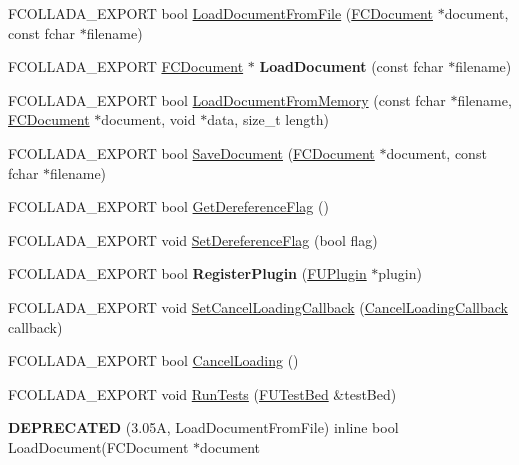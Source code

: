 \begin{DoxyCompactItemize}
\item 
FCOLLADA\_\-EXPORT bool \hyperlink{namespaceFCollada_a4dd920a75d275f9390696c22b947baf8}{LoadDocumentFromFile} (\hyperlink{classFCDocument}{FCDocument} $\ast$document, const fchar $\ast$filename)
\item 
\hypertarget{namespaceFCollada_a4d65778421a6aec996930eb4e026383b}{
FCOLLADA\_\-EXPORT \hyperlink{classFCDocument}{FCDocument} $\ast$ {\bfseries LoadDocument} (const fchar $\ast$filename)}
\label{namespaceFCollada_a4d65778421a6aec996930eb4e026383b}

\item 
FCOLLADA\_\-EXPORT bool \hyperlink{namespaceFCollada_affe76985d354d51bb861e2c9d4c2049c}{LoadDocumentFromMemory} (const fchar $\ast$filename, \hyperlink{classFCDocument}{FCDocument} $\ast$document, void $\ast$data, size\_\-t length)
\item 
FCOLLADA\_\-EXPORT bool \hyperlink{namespaceFCollada_af3a3d9fa7ae09b304daa26e2a8a69e99}{SaveDocument} (\hyperlink{classFCDocument}{FCDocument} $\ast$document, const fchar $\ast$filename)
\item 
FCOLLADA\_\-EXPORT bool \hyperlink{namespaceFCollada_a081d3740d838e9eb2fc7dd4611a513bf}{GetDereferenceFlag} ()
\item 
FCOLLADA\_\-EXPORT void \hyperlink{namespaceFCollada_a05ea72389195718910a74f5cd967fb47}{SetDereferenceFlag} (bool flag)
\item 
\hypertarget{namespaceFCollada_ae49a89b2b2b3a508271d80681faf09ea}{
FCOLLADA\_\-EXPORT bool {\bfseries RegisterPlugin} (\hyperlink{classFUPlugin}{FUPlugin} $\ast$plugin)}
\label{namespaceFCollada_ae49a89b2b2b3a508271d80681faf09ea}

\item 
FCOLLADA\_\-EXPORT void \hyperlink{namespaceFCollada_a0da1e31835b9301d1f2d3145a52f18a3}{SetCancelLoadingCallback} (\hyperlink{classIFunctor0}{CancelLoadingCallback} callback)
\item 
FCOLLADA\_\-EXPORT bool \hyperlink{namespaceFCollada_abc222aab9f5a4c0817746f91936cb2c1}{CancelLoading} ()
\item 
FCOLLADA\_\-EXPORT void \hyperlink{namespaceFCollada_a433dcd0d2b8b0bb17dc26ca5da1072cf}{RunTests} (\hyperlink{classFUTestBed}{FUTestBed} \&testBed)
\item 
\hypertarget{namespaceFCollada_a38eb5fd8b13e2ea0ec08bc290bac3bf7}{
{\bfseries DEPRECATED} (3.05A, LoadDocumentFromFile) inline bool LoadDocument(FCDocument $\ast$document}
\label{namespaceFCollada_a38eb5fd8b13e2ea0ec08bc290bac3bf7}


\end{DoxyCompactItemize}
